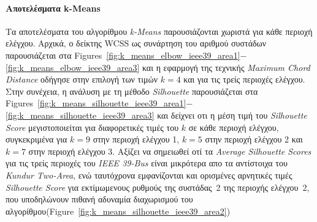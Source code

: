 \documentclass[conference]{IEEEtran}
\begin{document}
\paragraph{Αποτελέσματα k-Means}
Τα αποτελέσματα του αλγορίθμου \textit{k-Means} παρουσιάζονται χωριστά για κάθε περιοχή ελέγχου. Αρχικά, ο δείκτης WCSS ως συνάρτηση του αριθμού συστάδων παρουσιάζεται στα Figures~\ref{fig:k_means_elbow_ieee39_area1}$-$\ref{fig:k_means_elbow_ieee39_area3} και η εφαρμογή της τεχνικής \textit{Maximum Chord Distance} οδήγησε στην επιλογή των τιμών $k=4$ και για τις τρείς περιοχές ελέγχου. Στην συνέχεια, η ανάλυση με τη μέθοδο \textit{Silhouette} παρουσιάζεται στα Figures~\ref{fig:k_means_silhouette_ieee39_area1}$-$\ref{fig:k_means_silhouette_ieee39_area3} και δείχνει οτι η μέση τιμή του \textit{Silhouette Score} μεγιστοποιείται για διαφορετικές τιμές του $k$ σε κάθε περιοχή ελέγχου, συγκεκριμένα για $k=9$ στην περιοχή ελέγχου 1, $k=5$ στην περιοχή ελέγχου 2 και $k=7$ στην περιοχή ελέγχου 3. Αξίζει να σημειωθεί οτί τα \textit{Average Silhouette Scores} για τις τρείς περιοχές του \textit{IEEE 39-Bus} είναι μικρότερα απο τα αντίστοιχα του \textit{Kundur Two-Area}, ενώ ταυτόχρονα εμφανίζονται και ορισμένες αρνητικές τιμές \textit{Silhouette Score} για εκτίμωμενους ρυθμούς της συστάδας~2 της περιοχής ελέγχου~2, που υποδηλώνουν πιθανή αδυναμία διαχωρισμού του αλγορίθμου(Figure~\ref{fig:k_means_silhouette_ieee39_area2})
\end{document}
